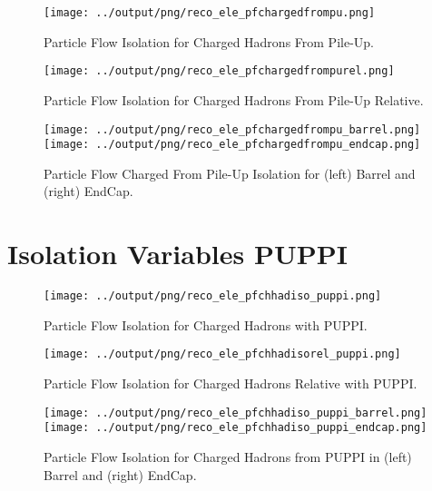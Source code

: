 \documentclass[11pt]{book}
\begin{document}
\begin{figure}[ht]
\centering
\texttt{[image: ../output/png/reco\_ele\_pfchargedfrompu.png]}
\caption{Particle Flow Isolation for Charged Hadrons From Pile-Up.}
\label{fig:reco_ele_pfchargedfrompu}
\end{figure}

\begin{figure}[ht]
\centering
\texttt{[image: ../output/png/reco\_ele\_pfchargedfrompurel.png]}
\caption{Particle Flow Isolation for Charged Hadrons From Pile-Up Relative.}
\label{fig:reco_ele_pfchargedfrompurel}
\end{figure}

\begin{figure}[ht]
\centering
\texttt{[image: ../output/png/reco\_ele\_pfchargedfrompu\_barrel.png]}
\texttt{[image: ../output/png/reco\_ele\_pfchargedfrompu\_endcap.png]}
\caption{Particle Flow Charged From Pile-Up Isolation for (left) Barrel and (right) EndCap.}
\label{fig:reco_ele_pfchargedfrompu_regions}
\end{figure}

\clearpage
\section{Isolation Variables PUPPI}

\begin{figure}[htb]
\centering
\texttt{[image: ../output/png/reco\_ele\_pfchhadiso\_puppi.png]}
\caption{Particle Flow Isolation for Charged Hadrons with PUPPI.}
\label{fig:reco_ele_pfchhadiso_puppi}
\end{figure}

\begin{figure}[htb]
\centering
\texttt{[image: ../output/png/reco\_ele\_pfchhadisorel\_puppi.png]}
\caption{Particle Flow Isolation for Charged Hadrons Relative with PUPPI.}
\label{fig:reco_ele_pfchhadisorel_puppi}
\end{figure}

\begin{figure}[ht]
\centering
\texttt{[image: ../output/png/reco\_ele\_pfchhadiso\_puppi\_barrel.png]}
\texttt{[image: ../output/png/reco\_ele\_pfchhadiso\_puppi\_endcap.png]}
\caption{Particle Flow Isolation for Charged Hadrons from PUPPI in (left) Barrel and (right) EndCap.}
\label{fig:reco_ele_pfchhadiso_puppi_regions}
\end{figure}
\end{document}

